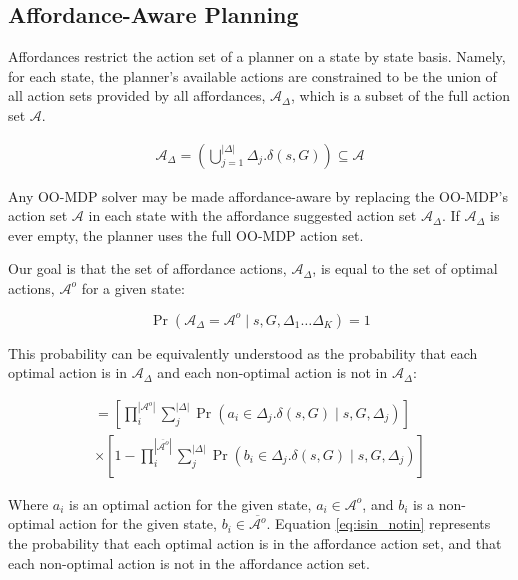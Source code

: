 \documentclass[conference]{IEEEtran}
\begin{document}
\subsection{Affordance-Aware Planning}
Affordances restrict the action set of a planner on a state by state basis. 
Namely, for each state, the planner's available actions are constrained to be the 
union of all action sets provided by all affordances, $\mathcal{A}_{\Delta}$, 
which is a subset of the full action set $\mathcal{A}$. 

\begin{align}
\mathcal{A}_{\Delta} = \left(\bigcup\limits_{j = 1}^{|\Delta|} \Delta_j.\delta(s,G) \right) \subseteq \mathcal{A}
\label{eq:afford_union}
\end{align}

Any OO-MDP solver may be made affordance-aware by replacing the 
OO-MDP's action set $\mathcal{A}$ in each state with the affordance 
suggested action set $\mathcal{A}_\Delta$. If $\mathcal{A}_\Delta$ is 
ever empty, the planner uses the full OO-MDP action set.

Our goal is that the set of affordance actions, $\mathcal{A}_{\Delta}$, 
is equal to the set of optimal actions, $\mathcal{A}^o$ for a given state:

\begin{equation} 
\Pr( \mathcal{A}_{\Delta} = \mathcal{A}^o \mid s, G, \Delta_1 \dots \Delta_K) = 1
\label{eq:opt}
\end{equation}

This probability can be equivalently understood as the probability that each
optimal action is in $\mathcal{A}_{\Delta}$ and each non-optimal action is 
not in $\mathcal{A}_{\Delta}$:

\begin{multline}
= \left[\prod_i^{|\mathcal{A}^o|} \sum_j^{|\Delta|} \Pr(a_i \in \Delta_j.\delta(s,G) \mid s, G, \Delta_j)\right] \\
\times \left[1 - \prod_i^{|\overline{\mathcal{A}^o}|} \sum_j^{|\Delta|} \Pr(b_i \in \Delta_j.\delta(s,G) \mid s, G, \Delta_j)\right]
\label{eq:isin_notin}
\end{multline}

Where $a_i$ is an optimal action for the given state, $a_i \in \mathcal{A}^o$,
and $b_i$ is a non-optimal action for the given state, $b_i \in \overline{\mathcal{A}^o}$.
Equation \ref{eq:isin_notin} represents the probability that each optimal action is in the
affordance action set, and that each non-optimal action is not in the affordance action set.
\end{document}
